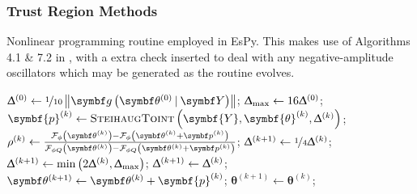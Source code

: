 \subsubsection{Trust Region Methods}

\begin{algorithm}
    \caption[
        Nonlinear programming routine employed in \acs{EsPy}.
    ]
    {
        Nonlinear programming routine employed in \acs{EsPy}. This makes use of
        Algorithms 4.1 \& 7.2 in \cite{Nocedal2006}, with a extra check
        inserted to deal with any negative-amplitude oscillators which may be
        generated as the routine evolves.
    }
    \label{alg:nlp}
    \begin{algorithmic}[1]
            \State $\trustradius{0} \gets \nicefrac{1}{10} \left\lVert \bdgthzeroY \right\rVert$;
            \State $\Updelta_{\text{max}} \gets 16 \Updelta^{(0)}$;
            \State $\symbf{p}^{(k)} \gets \textsc{SteihaugToint}\left(\symbf{Y}, \symbf{\theta}^{(k)}, \trustradius{k}\right)$;
                \State $\rho^{(k)} \gets
                    \frac
                        {\Fphithk - \Fphithkpk}
                        {\FphiQthk - \FphiQthkpk}$;
                \label{state:decrease-tr-start}
                \State $\Updelta^{(k+1)} \gets \nicefrac{1}{4} \Updelta^{(k)}$;
                    \label{state:decrease-tr-end}
                \label{state:increase-tr-start}
                \State $\Updelta^{(k+1)} \gets \min\left(2 \Updelta^{(k)}, \Updelta_{\text{max}}\right)$;
                    \label{state:increase-tr-end}
                \Else
                \State $\Updelta^{(k+1)} \gets \Updelta^{(k)}$;
                \EndIf
                \label{state:large-rho-start}
                    \State $\bthkplusone \gets \bthk + \symbf{p}^{(k)}$;
                    \label{state:large-rho-end}
                \Else
                \label{state:small-rho-start}
                    \State $\symbf{\theta}^{(k+1)} \gets \symbf{\theta}^{(k)}$;
                    \label{state:small-rho-end}
                \EndIf
                \label{state:neg-amp-start}

\end{algorithmic}
\end{algorithm}

